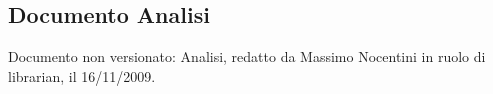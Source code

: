 \subsection{Documento Analisi}
Documento non versionato: Analisi, redatto da Massimo Nocentini in ruolo di librarian, il 16/11/2009.
